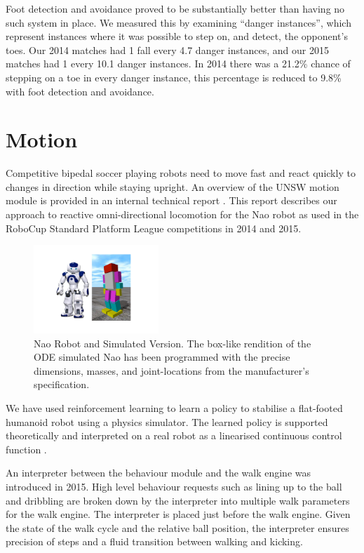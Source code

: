 \documentclass[runningheads,a4paper]{llncs}
\begin{document}
Foot detection and avoidance proved to be substantially better than having no such system in place. We measured this by examining ``danger instances'', which represent instances where it was possible to step on, and detect, the opponent's toes. Our 2014 matches had 1 fall every 4.7 danger instances, and our 2015 matches had 1 every 10.1 danger instances. In 2014 there was a 21.2\% chance of stepping on a toe in every danger instance, this percentage is reduced to 9.8\% with foot detection and avoidance.

\section{Motion}
Competitive bipedal soccer playing robots need to move fast and react quickly to changes in direction while staying upright. An overview of the UNSW motion module is provided in an internal technical report \cite{hengst2014walk}. This report describes our approach to reactive omni-directional locomotion for the Nao robot as used in the RoboCup Standard Platform League competitions in 2014 and 2015.

\begin{figure} [ht]
\centering
\includegraphics[width=0.42\textwidth]{Figures/NaoSim.pdf}
\caption{Nao Robot and Simulated Version. The box-like rendition of the ODE simulated Nao has been programmed with the precise dimensions, masses, and joint-locations from the manufacturer's specification.} \label{figNao}
\end{figure}

We have used reinforcement learning to learn a policy to stabilise a flat-footed humanoid robot using a physics simulator. The learned policy is supported theoretically and interpreted on a real robot as a linearised continuous control function \cite{hengst2015reinforcement}.  

An interpreter between the behaviour module and the walk engine was introduced in 2015. High level behaviour requests such as lining up to the ball and dribbling are broken down by the interpreter into multiple walk parameters for the walk engine. The interpreter is placed just before the walk engine. Given the state of the walk cycle and the relative ball position, the interpreter ensures precision of steps and a fluid transition between walking and kicking.
\end{document}
